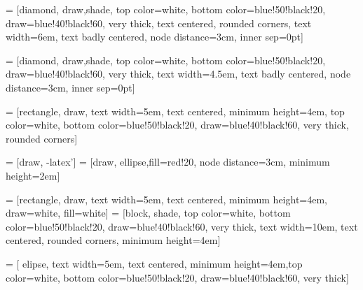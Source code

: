 \documentclass[a4paper,12pt]{article}
\begin{document}
 = [diamond, draw,shade, top color=white,
    bottom color=blue!50!black!20, draw=blue!40!black!60, very
    thick, text centered, rounded corners, text width=6em, text badly centered, node distance=3cm, inner sep=0pt]

  = [diamond, draw,shade,  top color=white,
    bottom color=blue!50!black!20, draw=blue!40!black!60, very
    thick, text width=4.5em, text badly centered, node distance=3cm, inner sep=0pt]

  = [rectangle, draw,  text width=5em, text centered, minimum height=4em, top color=white,  bottom color=blue!50!black!20, draw=blue!40!black!60, very thick, rounded corners]

 = [draw, -latex']
 = [draw, ellipse,fill=red!20, node distance=3cm,
    minimum height=2em]
   
 = [rectangle, draw,  text width=5em, text centered, minimum height=4em, draw=white, fill=white]
 = [block, shade, top color=white,
    bottom color=blue!50!black!20, draw=blue!40!black!60, very
    thick, text width=10em, text centered, rounded corners, minimum height=4em]

 = [ elipse, text width=5em, text centered, minimum height=4em,top color=white,
    bottom color=blue!50!black!20, draw=blue!40!black!60, very thick]





%



\end{document}
